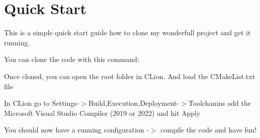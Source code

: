 \chapter{Quick Start }
\hypertarget{md__c_1_2_users_2overo_2_desktop_2_game_lab_i_i_i-_t_d_g_e_2tdge_2docs_2_quick_start}{}\label{md__c_1_2_users_2overo_2_desktop_2_game_lab_i_i_i-_t_d_g_e_2tdge_2docs_2_quick_start}
\label{md__c_1_2_users_2overo_2_desktop_2_game_lab_i_i_i-_t_d_g_e_2tdge_2docs_2_quick_start_autotoc_md0}%
%


This is a simple quick start guide how to clone my wonderfull project and get it running.


\begin{DoxyEnumerate}
\item You can clone the code with this command\+:
\end{DoxyEnumerate}


\begin{DoxyCode}{0}

\end{DoxyCode}



\begin{DoxyEnumerate}
\item Once cloned, you can open the root folder in CLion. And load the {\ttfamily CMake\+List.\+txt} file
\item In CLion go to Settings-\/\texorpdfstring{$>$}{>}Build,Execution,Deployment-\/\texorpdfstring{$>$}{>}Toolchanins add the Microsoft Visual Studio Compiler (2019 or 2022) and hit Apply
\item You should now have a running configuration -\/\texorpdfstring{$>$}{>} compile the code and have fun! 
\end{DoxyEnumerate}
